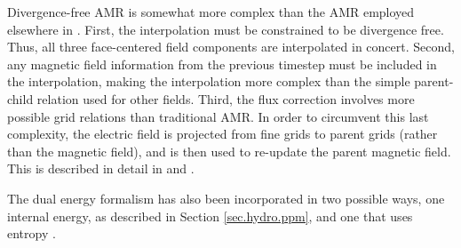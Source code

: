 Divergence-free AMR is somewhat more complex than the AMR employed
elsewhere in \enzo.  First, the interpolation must be constrained to be
divergence free.  Thus, all three face-centered field components are
interpolated in concert.  Second, any magnetic field information from
the previous timestep must be included in the interpolation, making the
interpolation more complex than the simple parent-child relation used
for other fields.  Third, the flux correction involves more possible
grid relations than traditional AMR.  In order to circumvent this last
complexity, the electric field is projected from fine grids to parent
grids (rather than the magnetic field), and is then used to re-update
the parent magnetic field.  This is described in detail in
\citet{Balsara99} and \citet{Collins10}.


The dual energy formalism has also been incorporated in two possible ways, one internal
energy, as described in Section \ref{sec.hydro.ppm}, and one that
uses entropy \cite{TVD93, Collins10}.

%

